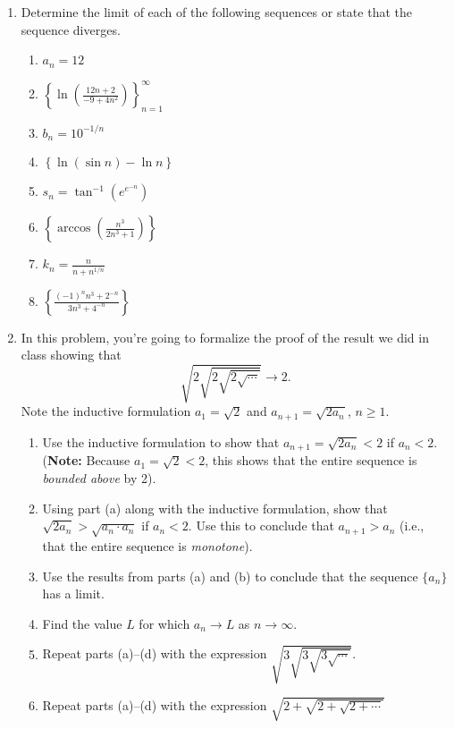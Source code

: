 \documentclass[12 pt]{article}
\begin{document}
\begin{enumerate}[leftmargin=0in, rightmargin=-0.25in]
	\item Determine the limit of each of the following sequences or state that the sequence diverges.
	\begin{multicols}{2}
		\begin{enumerate}
			\item $a_n=12$
			\item $\left\{\ln\left(\frac{12n+2}{-9+4n^2}\right)\right\}_{n=1}^\infty$
			\item $b_n=10^{-1/n}$
			\item $\left\{\ln{(\sin{n})}-\ln{n}\right\}$
			\item $s_n=\tan^{-1}\left(e^{e^{-n}}\right)$
			\item $\left\{\arccos\left(\frac{n^3}{2n^3+1}\right)\right\}$
			\item $k_n=\frac{n}{n+n^{1/n}}$
			\item $\left\{\frac{(-1)^nn^3+2^{-n}}{3n^3+4^{-n}}\right\}$
		\end{enumerate}
	\end{multicols}

	\item In this problem, you're going to formalize the proof of the result we did in class showing that $$\sqrt{2\sqrt{2\sqrt{2\sqrt{\cdots}}}}\longrightarrow 2.$$
	Note the inductive formulation $a_1=\sqrt{2}$ and $a_{n+1}=\sqrt{2a_n}$, $n\geq 1$.
	\begin{enumerate}
		\item Use the inductive formulation to show that $a_{n+1}=\sqrt{2a_n}<2$ if $a_n<2$. (\textbf{Note:} Because $a_1=\sqrt{2}<2$, this shows that the entire sequence is \textit{bounded above} by 2).
		\item Using part (a) along with the inductive formulation, show that $\sqrt{2a_n}>\sqrt{a_n\cdot a_n}$ if $a_n<2$. Use this to conclude that $a_{n+1}>a_n$ (i.e., that the entire sequence is \textit{monotone}).
		\item Use the results from parts (a) and (b) to conclude that the sequence $\{a_n\}$ has a limit.
		\item Find the value $L$ for which $a_n\to L$ as $n\to\infty$.
		\item Repeat parts (a)--(d) with the expression $\sqrt{3\sqrt{3\sqrt{3\sqrt{\cdots}}}}$.
		\item Repeat parts (a)--(d) with the expression $\sqrt{2+\sqrt{2+\sqrt{2+\cdots}}}$
	\end{enumerate}
	

\end{enumerate}
\end{document}
